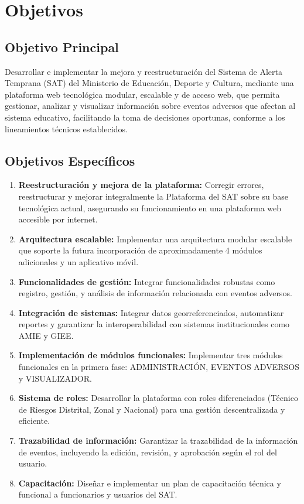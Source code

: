 \section{Objetivos}

\subsection{Objetivo Principal}
Desarrollar e implementar la mejora y reestructuración del Sistema de Alerta Temprana (SAT) del Ministerio de Educación, Deporte y Cultura, mediante una plataforma web tecnológica modular, escalable y de acceso web, que permita gestionar, analizar y visualizar información sobre eventos adversos que afectan al sistema educativo, facilitando la toma de decisiones oportunas, conforme a los lineamientos técnicos establecidos.

\subsection{Objetivos Específicos}

\begin{enumerate}
    \item \textbf{Reestructuración y mejora de la plataforma:} Corregir errores, reestructurar y mejorar integralmente la Plataforma del SAT sobre su base tecnológica actual, asegurando su funcionamiento en una plataforma web accesible por internet.
    
    \item \textbf{Arquitectura escalable:} Implementar una arquitectura modular escalable que soporte la futura incorporación de aproximadamente 4 módulos adicionales y un aplicativo móvil.
    
    \item \textbf{Funcionalidades de gestión:} Integrar funcionalidades robustas como registro, gestión, y análisis de información relacionada con eventos adversos.
    
    \item \textbf{Integración de sistemas:} Integrar datos georreferenciados, automatizar reportes y garantizar la interoperabilidad con sistemas institucionales como AMIE y GIEE.
    
    \item \textbf{Implementación de módulos funcionales:} Implementar tres módulos funcionales en la primera fase: ADMINISTRACIÓN, EVENTOS ADVERSOS y VISUALIZADOR.
    
    \item \textbf{Sistema de roles:} Desarrollar la plataforma con roles diferenciados (Técnico de Riesgos Distrital, Zonal y Nacional) para una gestión descentralizada y eficiente.
    
    \item \textbf{Trazabilidad de información:} Garantizar la trazabilidad de la información de eventos, incluyendo la edición, revisión, y aprobación según el rol del usuario.
    
    \item \textbf{Capacitación:} Diseñar e implementar un plan de capacitación técnica y funcional a funcionarios y usuarios del SAT.
\end{enumerate}
